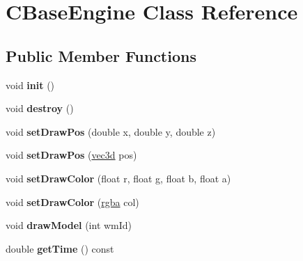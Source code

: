 \hypertarget{class_c_base_engine}{
\section{CBaseEngine Class Reference}
\label{class_c_base_engine}
}
\subsection*{Public Member Functions}
\begin{DoxyCompactItemize}
\item 
\hypertarget{class_c_base_engine_a9317cc0ea0ea95db977d4007c1cdc79a}{
void {\bfseries init} ()}
\label{class_c_base_engine_a9317cc0ea0ea95db977d4007c1cdc79a}

\item 
\hypertarget{class_c_base_engine_a876301de40f6e8f46cb575c78a14edfb}{
void {\bfseries destroy} ()}
\label{class_c_base_engine_a876301de40f6e8f46cb575c78a14edfb}

\item 
\hypertarget{class_c_base_engine_a64de0ea7d950b86c6128b7a599c93554}{
void {\bfseries setDrawPos} (double x, double y, double z)}
\label{class_c_base_engine_a64de0ea7d950b86c6128b7a599c93554}

\item 
\hypertarget{class_c_base_engine_af1e4044b6331cf52c553ef3ab378a066}{
void {\bfseries setDrawPos} (\hyperlink{classvec3d}{vec3d} pos)}
\label{class_c_base_engine_af1e4044b6331cf52c553ef3ab378a066}

\item 
\hypertarget{class_c_base_engine_a34636846e1aaa5d12a279c3c333da20f}{
void {\bfseries setDrawColor} (float r, float g, float b, float a)}
\label{class_c_base_engine_a34636846e1aaa5d12a279c3c333da20f}

\item 
\hypertarget{class_c_base_engine_a8ccf173fea0679fd1d5044a5d871f23f}{
void {\bfseries setDrawColor} (\hyperlink{classrgba}{rgba} col)}
\label{class_c_base_engine_a8ccf173fea0679fd1d5044a5d871f23f}

\item 
\hypertarget{class_c_base_engine_aabc5cdf56e652abd70c239464cfca056}{
void {\bfseries drawModel} (int wmId)}
\label{class_c_base_engine_aabc5cdf56e652abd70c239464cfca056}

\item 
\hypertarget{class_c_base_engine_ab16ca91a8828127cb4523069d771236c}{
double {\bfseries getTime} () const }
\label{class_c_base_engine_ab16ca91a8828127cb4523069d771236c}


\end{DoxyCompactItemize}
